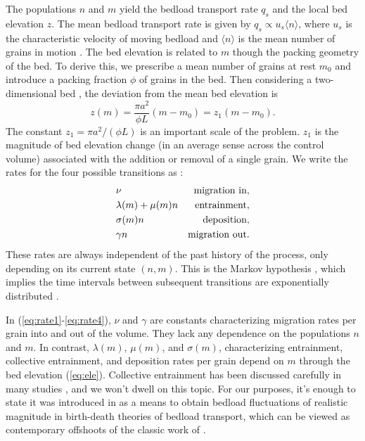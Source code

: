 \documentclass[draft]{agujournal2018}
\newcommand\be{\begin{equation}} %
\newcommand\ee{\end{equation}}   %
\newcommand\bra{\langle}
\newcommand\ket{\rangle}
\begin{document}
The populations $n$ and $m$ yield the bedload transport rate $q_s$ and the local bed elevation $z$.
The mean bedload transport rate is given by $q_s \propto u_s \bra n \ket$, where $u_s$ is the characteristic velocity of moving bedload and $\bra n \ket $ is the mean number of grains in motion \citep[e.g.][]{Charru2004, Ancey2008, Furbish2012a}.
The bed elevation is related to $m$ though the packing geometry of the bed.
To derive this, we prescribe a mean number of grains at rest $m_0$ and introduce a packing fraction $\phi$ of grains in the bed.
Then considering a two-dimensional bed \citep[e.g.][]{Einstein1950, Paintal1971}, the deviation from the mean bed elevation is
\be z(m) = \frac{\pi a^2}{\phi L}(m-m_0) = z_1(m-m_0). \label{eq:ele}\ee
The constant $z_1 = \pi a^2/(\phi L)$ is an important scale of the problem. 
$z_1$ is the magnitude of bed elevation change (in an average sense across the control volume) associated with the addition or removal of a single grain.
We write the rates for the four possible transitions as \citep[e.g.][]{Ancey2008}:
\begin{align}
 &\nu & \text{migration in}, \label{eq:rate1}\\
 &\lambda(m) + \mu(m) n  & \text{entrainment},  \label{eq:rate2}\\
 &\sigma(m) n & \text{deposition},\label{eq:rate3}\\
 &\gamma n & \text{migration out\label{eq:rate4}}.
\end{align}
These rates are always independent of the past history of the process, only depending on its current state $(n,m)$. 
This is the Markov hypothesis \citep[e.g.][]{Cox1965}, which implies the time intervals between subsequent transitions are exponentially distributed \citep[e.g.][]{Gillespie2007}.

In (\ref{eq:rate1}-\ref{eq:rate4}), $\nu$ and $\gamma$ are constants characterizing migration rates per grain into and out of the volume. 
They lack any dependence on the populations $n$ and $m$.
In contrast, $\lambda(m)$, $\mu(m)$, and $\sigma(m)$, characterizing entrainment, collective entrainment, and deposition rates per grain depend on $m$ through the bed elevation (\ref{eq:ele}).
Collective entrainment has been discussed carefully in many studies \citep[e.g.][]{Ancey2008, Heyman2013, Heyman2014, Ma2014, Ancey2014a}, and we won't dwell on this topic. For our purposes, it's enough to state it was introduced in \citet{Ancey2008} as a means to obtain bedload fluctuations of realistic magnitude in birth-death theories of bedload transport, which can be viewed as contemporary offshoots of the classic work of \citet{Einstein1950}.
\end{document}
